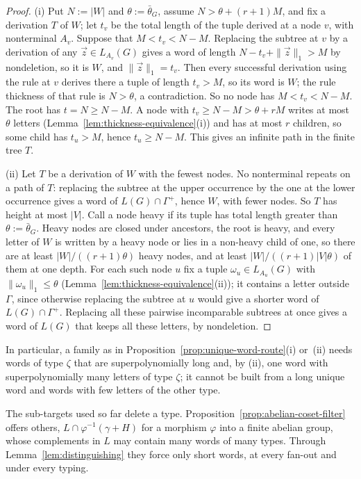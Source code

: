 \documentclass[11pt]{article}
\numberwithin{equation}{section}
\theoremstyle{plain}
\theoremstyle{definition}
\theoremstyle{remark}
\newcommand{\tuple}[1]{\vec{#1}}
\theoremstyle{plain}
\begin{document}
\begin{proof}
(i) 
Put $N:=|W|$ and $\theta:=\bar\theta_G$, assume $N>\theta+(r+1)M$, and fix a
derivation $T$ of $W$; let $t_v$ be the total length of the tuple derived at a
node $v$, with nonterminal $A_v$.  Suppose that $M<t_v<N-M$.  Replacing the
subtree at $v$ by a derivation of any $\tuple z\in L_{A_v}(G)$ gives a word of
length $N-t_v+\|\tuple z\|_1>M$ by nondeletion, so it is $W$, and
$\|\tuple z\|_1=t_v$.  Then every successful derivation using the rule
at $v$ derives there a tuple of length $t_v>M$, so its word is $W$; the rule thickness of that rule is $N>\theta$, a contradiction.  So no node
has $M<t_v<N-M$.  The root has $t=N\ge N-M$.  A node with $t_v\ge N-M>\theta+rM$
writes at most $\theta$ letters (Lemma~\ref{lem:thickness-equivalence}(i)) and has
at most $r$ children, so some child has $t_u>M$, hence $t_u\ge N-M$.  This gives
an infinite path in the finite tree $T$.

(ii) Let $T$ be a derivation of $W$ with the fewest nodes.  No nonterminal
repeats on a path of $T$: replacing the subtree at the upper occurrence by the one
at the lower occurrence gives a word of $L(G)\cap\Gamma^+$, hence $W$, with fewer
nodes.  So
$T$ has height at most $|V|$.  Call a node heavy if its tuple has total length
greater than $\theta:=\bar\theta_G$.  Heavy nodes are closed under ancestors, the
root is heavy, and every letter of $W$ is written by a heavy node or lies in a
non-heavy child of one, so there are at least $|W|/((r+1)\theta)$ heavy nodes,
and at least $|W|/((r+1)|V|\theta)$ of them at one depth.  For each such node $u$
fix a tuple $\omega_u\in L_{A_u}(G)$ with $\|\omega_u\|_1\le\theta$
(Lemma~\ref{lem:thickness-equivalence}(ii)); it contains a letter outside
$\Gamma$, since otherwise replacing the subtree at $u$ would give a shorter word of
$L(G)\cap\Gamma^+$.
Replacing all these pairwise incomparable subtrees at once gives a word of $L(G)$
that keeps all these letters, by nondeletion.
\end{proof}

In particular, a family as in Proposition~\ref{prop:unique-word-route}(i)
or~(ii) needs words of type $\zeta$ that are superpolynomially long and, by (ii),
one word with superpolynomially many letters of type $\zeta$; it cannot be built
from a long unique word and words with few letters of the other type.

The sub-targets used so far delete a type.  Proposition~\ref{prop:abelian-coset-filter}
offers others, $L\cap\varphi^{-1}(\gamma+H)$ for a morphism $\varphi$ into a finite
abelian group, whose complements in $L$ may contain many words of many types.
Through Lemma~\ref{lem:distinguishing} they force only short words, at every
fan-out and under every typing.
\end{document}

